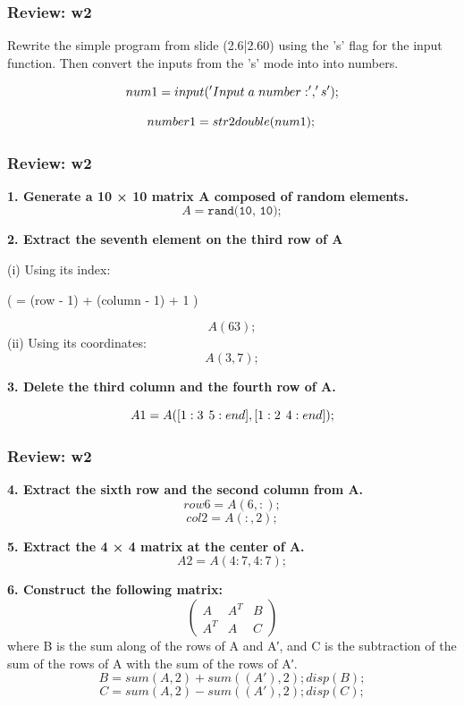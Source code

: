 \documentclass[
	11pt, %
]{beamer}
\begin{document}

\begin{frame}
	\frametitle{Review: w2}

	Rewrite the simple program from slide (2.6|2.60) using the 's' flag for the input function. Then convert the inputs from the 's' mode into into numbers.

\vspace{1.5cm}
\[
        num1 = input('Input \hspace{0.1cm} a \hspace{0.1cm} number: ','s');
\]

\[
        number1 = str2double(num1); \\
\]

\end{frame}


\begin{frame}
	\frametitle{Review: w2}

	\textbf{1. Generate a 10 × 10 matrix A composed of random elements.}
\[
A = \texttt{rand(10, 10)};
\]

\textbf{2. Extract the seventh element on the third row of A}

(i) Using its index:

 (  = (row - 1) + (column - 1) \times {} + 1 )
 
\[
A(63);
\]
(ii) Using its coordinates:
\[
A(3, 7);
\]

\textbf{3. Delete the third column and the fourth row of A.}

\[
A1 = A([1:3 \hspace{0.15cm} 5:end],[1:2 \hspace{0.15cm} 4:end]);
\]


\end{frame}



\begin{frame}
	\frametitle{Review: w2}

	\textbf{4. Extract the sixth row and the second column from A.}
\[
row6 = A(6,:); 
\]
\[
col2 = A(:,2);
\]


\textbf{5. Extract the 4 × 4 matrix at the center of A.}
\[
A2 = A(4:7,4:7);
\]


\textbf{6. Construct the following matrix:}
\[
\begin{pmatrix}
A & A^T & B \\
A^T & A & C
\end{pmatrix}
\]
where B is the sum along of the rows of A and A′, and C is the subtraction of the sum of the rows of A with the sum of the rows of A′.
    \[
    B = sum(A,2)+sum((A'),2); disp(B); \]
    \[C = sum(A,2)-sum((A'),2); disp(C); \]


\end{frame}
\end{document}
